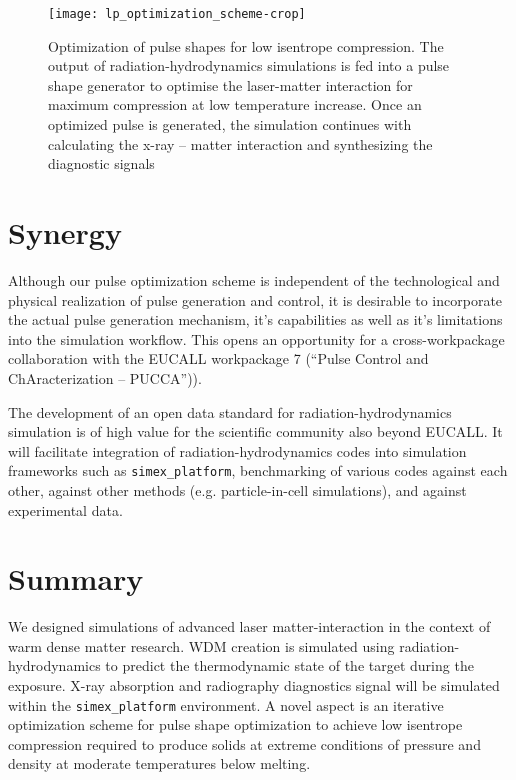 \documentclass[10pt]{scrartcl}
\begin{document}
\begin{figure}[ht]
  \begin{center}
    \texttt{[image: lp\_optimization\_scheme-crop]}
  \end{center}
  \caption{Optimization of pulse shapes for low isentrope compression. The
  output of radiation-hydrodynamics simulations is fed into a pulse shape
generator to optimise the laser-matter interaction for maximum compression at
low temperature increase. Once an optimized pulse is generated, the simulation
continues with calculating the x-ray -- matter interaction and synthesizing the
diagnostic signals}
  \label{fig:lp_optimization_schem}
\end{figure}

\section{Synergy}

Although our pulse optimization scheme is  independent of the technological and
physical realization of pulse generation and control, it is desirable to
incorporate the actual pulse generation mechanism, it's capabilities as well as
it's limitations into the simulation workflow.  This opens an opportunity for
a cross-workpackage collaboration with the EUCALL workpackage 7 (``Pulse Control and
ChAracterization -- PUCCA'')).

The development of an open data standard for radiation-hydrodynamics simulation is of high value for the scientific community
also beyond EUCALL. It will facilitate integration of radiation-hydrodynamics codes into simulation frameworks such as
\texttt{simex\_platform}, benchmarking of various codes against each other, against other methods (e.g. particle-in-cell simulations), and
against experimental data.

\section{Summary}
We designed simulations of advanced laser matter-interaction in the context of warm dense matter research. WDM creation is
simulated using radiation-hydrodynamics to predict the thermodynamic state of
the target during the exposure. X-ray absorption and radiography diagnostics
signal will be simulated within the \texttt{simex\_platform} environment. A
novel aspect is an iterative optimization scheme for pulse shape optimization to
achieve low isentrope compression required to produce solids at extreme
conditions of pressure and density at moderate temperatures below melting.

%
\newpage
%
\printbibliography
\end{document}
